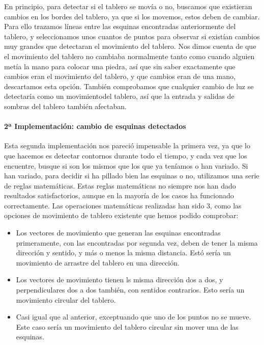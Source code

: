 \documentclass[12pt,a4paper]{report}
\begin{document}
En principio, para detectar si el tablero se movía o no, buscamos que existieran
cambios en los bordes del tablero, ya que si los movemos, estos deben de
cambiar. Para ello trazamos líneas entre las esquinas encontradas anteriormente
del tablero, y seleccionamos unos cuantos de puntos para observar si
existían cambios muy grandes que detectaran el movimiento del tablero. Nos dimos
cuenta de que el movimiento del tablero no cambiaba normalmente tanto como
cuando alguien metía la mano para colocar una piedra, así que sin saber
exactamente que cambios eran el movimiento del tablero, y que cambios eran de
una mano, descartamos esta opción. También comprobamos que cualquier cambio de
luz se detectaría como un movimientodel tablero, así que la entrada y salidas de
sombras del tablero también afectaban. 

\paragraph{2ª Implementación: cambio de esquinas detectados} 

Esta segunda implementación nos pareció impensable la primera vez, ya que lo que
hacemos es detectar contornos durante todo el tiempo, y cada vez que los
encuentre, busque si son los mismos que los que ya teníamos o han variado. Si
han variado, para decidir si ha pillado bien las esquinas o no, utilizamos una
serie de reglas matemáticas. Estas reglas matemáticas no siempre nos han dado
resultados satisfactorios, aunque en la mayoría de los casos ha funcionado
correctamente. Las operaciones matemáticas realizadas han sido 3, como las
opciones de movimiento de tablero existente que hemos podido comprobar:
\begin{itemize}
    \item Los vectores de movimiento que generan las esquinas encontradas
    primeramente, con las encontradas por segunda vez, deben de tener la misma
    dirección y sentido, y más o menos la misma distancia. Estó sería un
    movimiento de arrastre del tablero en una dirección.
    \item Los vectores de movimiento tienen ls misma dirección dos a dos, y
    perpendiculares dos a dos también, con sentidos contrarios. Esto sería un
    movimiento circular del tablero.
    \item Casi igual que al anterior, exceptuando que uno de los puntos no se
    mueve. Este caso sería un movimiento del tablero circular sin mover una de
    las esquinas. 
\end{itemize}
\end{document}
